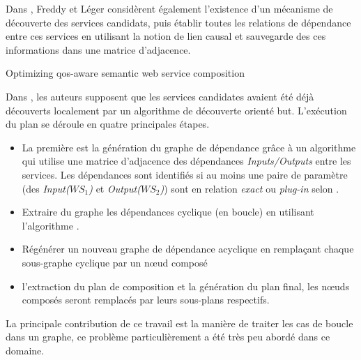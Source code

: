   \begin{text}
    Dans \cite{lecue2006formal}, Freddy et Léger considèrent également
    l'existence d'un mécanisme de découverte des services candidats,
    puis établir toutes les relations de dépendance entre ces services
    en utilisant la notion de lien causal et sauvegarde des ces
    informations dans une matrice d'adjacence.

    {\color{red} %
      Optimizing qos-aware semantic web service composition
      \cite{lecue2009optimizing}
    }
  \end{text}

  \begin{text}
    Dans \cite{omer2009dependency}, les auteurs supposent que les
    services candidates avaient été déjà découverts localement par un
    algorithme de découverte orienté but. L'exécution du plan se
    déroule en quatre principales étapes.

    \SpecialItem
    \begin{itemize}
    \item La première est la génération du graphe de dépendance grâce
      à un algorithme qui utilise une matrice d'adjacence des
      dépendances \textit{Inputs/Outputs} entre les services. Les
      dépendances sont identifiés si au moins une paire de paramètre
      (des \textit{Input($WS_1$)} et \textit{Output($WS_2$)}) sont en
      relation \textit{exact} ou \textit{plug-in} selon
      \cite{paolucci2002semantic}.

    \item Extraire du graphe les dépendances cyclique (en boucle) en
      utilisant l'algorithme \cite{tarjan1973enumeration}.

    \item Régénérer un nouveau graphe de dépendance acyclique en
      remplaçant chaque sous-graphe cyclique par un nœud composé

    \item l'extraction du plan de composition et la génération du plan
      final, les nœuds composés seront remplacés par leurs sous-plans
      respectifs.
    \end{itemize}

    La principale contribution de ce travail est la manière de traiter
    les cas de boucle dans un graphe, ce problème particulièrement a été
    très peu abordé dans ce domaine.
  \end{text}

